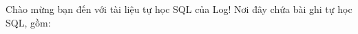Chào mừng bạn đến với tài liệu tự học SQL của Log! Nơi đây chứa bài ghi tự học SQL, gồm:

\begin{enumerate}

\end{enumerate}
